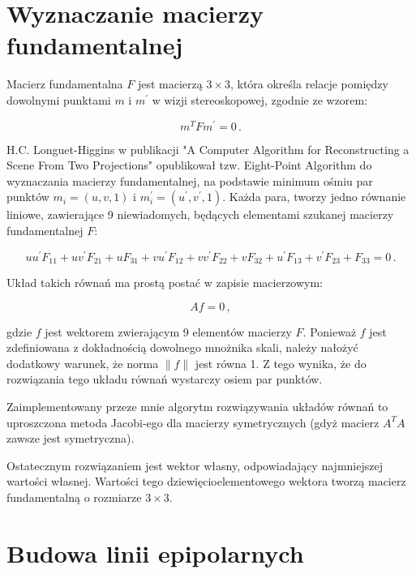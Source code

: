 \section{Wyznaczanie macierzy fundamentalnej}

Macierz fundamentalna $F$ jest macierzą $3 \times 3$, która określa relacje
pomiędzy dowolnymi punktami $m$ i $m^\prime$ w wizji stereoskopowej, zgodnie ze
wzorem: 

\begin{equation}
  m^TFm^\prime = 0\,.
\end{equation}

H.C. Longuet-Higgins w publikacji "A Computer Algorithm for Reconstructing a
Scene From Two Projections" \cite{eight_point} opublikował tzw.  Eight-Point
Algorithm do wyznaczania macierzy fundamentalnej, na podstawie minimum ośmiu
par punktów $m_i=(u,v,1)$ i $m_i^\prime=(u^\prime,v^\prime,1)$.  Każda para,
tworzy jedno równanie liniowe, zawierające 9 niewiadomych, będących elementami
szukanej macierzy fundamentalnej $F$: 

\begin{equation} uu^\prime F_{11} + uv^\prime F_{21} + uF_{31} + vu^\prime
  F_{12} + vv^\prime F_{22} + vF_{32} + u^\prime F_{13} + v^\prime F_{23} +
  F_{33} = 0\,.  \end{equation}

Układ takich równań ma prostą postać w zapisie macierzowym:

\begin{equation} Af=0\,, \end{equation}

gdzie $f$ jest wektorem zwierającym 9 elementów macierzy $F$. Ponieważ $f$ jest
zdefiniowana z dokładnością dowolnego mnożnika skali, należy nałożyć dodatkowy
warunek, że norma $\|f\|$ jest równa 1. Z tego wynika, że do rozwiązania tego
układu równań wystarczy osiem par punktów.

Zaimplementowany przeze mnie algorytm rozwiązywania układów równań to
uproszczona metoda Jacobi-ego dla macierzy symetrycznych (gdyż macierz $A^TA$
zawsze jest symetryczna).

Ostatecznym rozwiązaniem jest wektor własny, odpowiadający najmniejszej
wartości własnej.  Wartości tego dziewięcioelementowego wektora tworzą macierz
fundamentalną o rozmiarze $3 \times 3$.

\section{Budowa linii epipolarnych}

